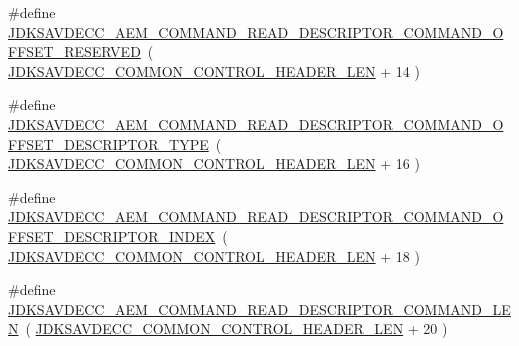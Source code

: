 \begin{DoxyCompactItemize}
\item 
\#define \hyperlink{group__command__read__descriptor_ga0e7cd7a4b56e7466939aa7eb47d92a9a}{J\+D\+K\+S\+A\+V\+D\+E\+C\+C\+\_\+\+A\+E\+M\+\_\+\+C\+O\+M\+M\+A\+N\+D\+\_\+\+R\+E\+A\+D\+\_\+\+D\+E\+S\+C\+R\+I\+P\+T\+O\+R\+\_\+\+C\+O\+M\+M\+A\+N\+D\+\_\+\+O\+F\+F\+S\+E\+T\+\_\+\+R\+E\+S\+E\+R\+V\+ED}~( \hyperlink{group__jdksavdecc__avtp__common__control__header_gaae84052886fb1bb42f3bc5f85b741dff}{J\+D\+K\+S\+A\+V\+D\+E\+C\+C\+\_\+\+C\+O\+M\+M\+O\+N\+\_\+\+C\+O\+N\+T\+R\+O\+L\+\_\+\+H\+E\+A\+D\+E\+R\+\_\+\+L\+EN} + 14 )
\item 
\#define \hyperlink{group__command__read__descriptor_ga110f254c3beab0e11e954498cd7e16c5}{J\+D\+K\+S\+A\+V\+D\+E\+C\+C\+\_\+\+A\+E\+M\+\_\+\+C\+O\+M\+M\+A\+N\+D\+\_\+\+R\+E\+A\+D\+\_\+\+D\+E\+S\+C\+R\+I\+P\+T\+O\+R\+\_\+\+C\+O\+M\+M\+A\+N\+D\+\_\+\+O\+F\+F\+S\+E\+T\+\_\+\+D\+E\+S\+C\+R\+I\+P\+T\+O\+R\+\_\+\+T\+Y\+PE}~( \hyperlink{group__jdksavdecc__avtp__common__control__header_gaae84052886fb1bb42f3bc5f85b741dff}{J\+D\+K\+S\+A\+V\+D\+E\+C\+C\+\_\+\+C\+O\+M\+M\+O\+N\+\_\+\+C\+O\+N\+T\+R\+O\+L\+\_\+\+H\+E\+A\+D\+E\+R\+\_\+\+L\+EN} + 16 )
\item 
\#define \hyperlink{group__command__read__descriptor_gaae699f5e728724a80614987532823b9b}{J\+D\+K\+S\+A\+V\+D\+E\+C\+C\+\_\+\+A\+E\+M\+\_\+\+C\+O\+M\+M\+A\+N\+D\+\_\+\+R\+E\+A\+D\+\_\+\+D\+E\+S\+C\+R\+I\+P\+T\+O\+R\+\_\+\+C\+O\+M\+M\+A\+N\+D\+\_\+\+O\+F\+F\+S\+E\+T\+\_\+\+D\+E\+S\+C\+R\+I\+P\+T\+O\+R\+\_\+\+I\+N\+D\+EX}~( \hyperlink{group__jdksavdecc__avtp__common__control__header_gaae84052886fb1bb42f3bc5f85b741dff}{J\+D\+K\+S\+A\+V\+D\+E\+C\+C\+\_\+\+C\+O\+M\+M\+O\+N\+\_\+\+C\+O\+N\+T\+R\+O\+L\+\_\+\+H\+E\+A\+D\+E\+R\+\_\+\+L\+EN} + 18 )
\item 
\#define \hyperlink{group__command__read__descriptor_gac688b92a5f2db14b588702961884f6a3}{J\+D\+K\+S\+A\+V\+D\+E\+C\+C\+\_\+\+A\+E\+M\+\_\+\+C\+O\+M\+M\+A\+N\+D\+\_\+\+R\+E\+A\+D\+\_\+\+D\+E\+S\+C\+R\+I\+P\+T\+O\+R\+\_\+\+C\+O\+M\+M\+A\+N\+D\+\_\+\+L\+EN}~( \hyperlink{group__jdksavdecc__avtp__common__control__header_gaae84052886fb1bb42f3bc5f85b741dff}{J\+D\+K\+S\+A\+V\+D\+E\+C\+C\+\_\+\+C\+O\+M\+M\+O\+N\+\_\+\+C\+O\+N\+T\+R\+O\+L\+\_\+\+H\+E\+A\+D\+E\+R\+\_\+\+L\+EN} + 20 )
\end{DoxyCompactItemize}
